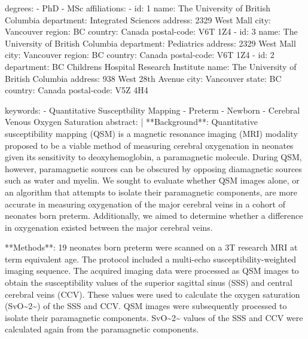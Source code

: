 \documentclass[
  letterpaper,
  DIV=11,
  numbers=noendperiod]{scrartcl}
\newenvironment{Shaded}{\begin{snugshade}}{\end{snugshade}}
\newcommand{\NormalTok}[1]{\textcolor[rgb]{0.00,0.23,0.31}{#1}}
\begin{document}
\begin{Shaded}
\begin{Highlighting}[]
\NormalTok{    degrees:}
\NormalTok{      {-} PhD}
\NormalTok{      {-} MSc}
\NormalTok{affiliations:}
\NormalTok{  {-} id: 1}
\NormalTok{    name: The University of British Columbia}
\NormalTok{    department: Integrated Sciences}
\NormalTok{    address: 2329 West Mall}
\NormalTok{    city: Vancouver}
\NormalTok{    region: BC}
\NormalTok{    country: Canada}
\NormalTok{    postal{-}code: V6T 1Z4}
\NormalTok{  {-} id: 3}
\NormalTok{    name: The University of British Columbia}
\NormalTok{    department: Pediatrics}
\NormalTok{    address: 2329 West Mall}
\NormalTok{    city: Vancouver}
\NormalTok{    region: BC}
\NormalTok{    country: Canada}
\NormalTok{    postal{-}code: V6T 1Z4}
\NormalTok{  {-} id: 2}
\NormalTok{    department: BC Children\textquotesingle{}s Hospital Research Institute}
\NormalTok{    name: The University of British Columbia}
\NormalTok{    address: 938 West 28th Avenue}
\NormalTok{    city: Vancouver}
\NormalTok{    state: BC}
\NormalTok{    country: Canada}
\NormalTok{    postal{-}code: V5Z 4H4}

\NormalTok{keywords:}
\NormalTok{  {-} Quantitative Susceptbility Mapping}
\NormalTok{  {-} Preterm}
\NormalTok{  {-} Newborn}
\NormalTok{  {-} Cerebral Venous Oxygen Saturation}
\NormalTok{abstract: |}
\NormalTok{  **Background**: Quantitative susceptibility mapping (QSM) is a magnetic resonance imaging (MRI) modality proposed to be a viable method of measuring cerebral oxygenation in neonates given its sensitivity to deoxyhemoglobin, a paramagnetic molecule. During QSM, however, paramagnetic sources can be obscured by opposing diamagnetic sources such as water and myelin. We sought to evaluate whether QSM images alone, or an algorithm that attempts to isolate their paramagnetic components, are more accurate in measuring oxygenation of the major cerebral veins in a cohort of neonates born preterm. Additionally, we aimed to determine whether a difference in oxygenation existed between the major cerebral veins.}
  
\NormalTok{  **Methods**: 19 neonates born preterm were scanned on a 3T research MRI at term equivalent age. The protocol included a multi{-}echo susceptibility{-}weighted imaging sequence. The acquired imaging data were processed as QSM images to obtain the susceptibility values of the superior sagittal sinus (SSS) and central cerebral veins (CCV). These values were used to calculate the oxygen saturation (SvO\textasciitilde{}2\textasciitilde{}) of the SSS and CCV.  QSM images were subsequently processed to isolate their paramagnetic components. SvO\textasciitilde{}2\textasciitilde{} values of the SSS and CCV were calculated again from the paramagnetic components.}
  

\end{Highlighting}
\end{Shaded}
\end{document}
